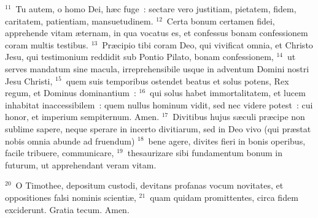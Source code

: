 ${}^{11}$~Tu autem, o homo Dei, h\ae c fuge~: sectare vero justitiam, pietatem, fidem, caritatem, patientiam, mansuetudinem.
${}^{12}$~Certa bonum certamen fidei, apprehende vitam \ae ternam, in qua vocatus es, et confessus bonam confessionem coram multis testibus.
${}^{13}$~Pr\ae cipio tibi coram Deo, qui vivificat omnia, et Christo Jesu, qui testimonium reddidit sub Pontio Pilato, bonam confessionem,
${}^{14}$~ut serves mandatum sine macula, irreprehensibile usque in adventum Domini nostri Jesu Christi,
${}^{15}$~quem suis temporibus ostendet beatus et solus potens, Rex regum, et Dominus dominantium~:
${}^{16}$~qui solus habet immortalitatem, et lucem inhabitat inaccessibilem~: quem nullus hominum vidit, sed nec videre potest~: cui honor, et imperium sempiternum. Amen.
${}^{17}$~Divitibus hujus s\ae culi pr\ae cipe non sublime sapere, neque sperare in incerto divitiarum, sed in Deo vivo (qui pr\ae stat nobis omnia abunde ad fruendum)
${}^{18}$~bene agere, divites fieri in bonis operibus, facile tribuere, communicare,
${}^{19}$~thesaurizare sibi fundamentum bonum in futurum, ut apprehendant veram vitam.


${}^{20}$~O Timothee, depositum custodi, devitans profanas vocum novitates, et oppositiones falsi nominis scienti\ae ,
${}^{21}$~quam quidam promittentes, circa fidem exciderunt. Gratia tecum. Amen.
